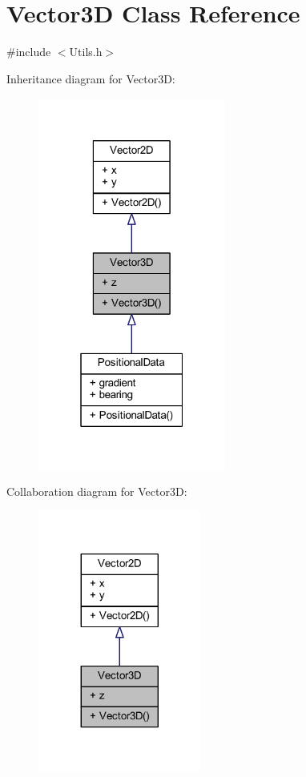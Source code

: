 \hypertarget{class_vector3_d}{}\section{Vector3D Class Reference}
\label{class_vector3_d}


{\ttfamily \#include $<$Utils.\+h$>$}



Inheritance diagram for Vector3D\+:
\nopagebreak
\begin{figure}[H]
\begin{center}
\leavevmode
\includegraphics[width=175pt]{class_vector3_d__inherit__graph}
\end{center}
\end{figure}


Collaboration diagram for Vector3D\+:
\nopagebreak
\begin{figure}[H]
\begin{center}
\leavevmode
\includegraphics[width=152pt]{class_vector3_d__coll__graph}
\end{center}
\end{figure}
